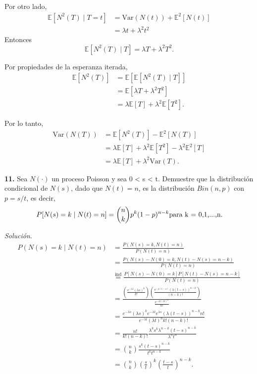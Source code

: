 \documentclass[12pt]{article}
\newcommand{\E}{\mathbb{E}}
\begin{document}
Por otro lado, 
\begin{align*}
\E[N^2(T) \mid T = t] &= \textrm{Var}(N(t)) + \E^2[N(t)] \\    
&= \lambda t + \lambda^2 t^2
\end{align*}
Entonces
\[ \E[N^2(T) \mid T] = \lambda T + \lambda^2 T^2. \]

Por propiedades de la esperanza iterada, 
\begin{align*}
    \E[N^2(T)] &= \E [ \E[N^2(T) \mid T] ] \\
                &= \E [\lambda T + \lambda^2 T^2] \\
                &= \lambda \E[T] + \lambda^2 \E[T^2].
\end{align*}

Por lo tanto,
\begin{align*}
    \textrm{Var}(N(T)) &= \E[N^2(T)] - \E^2[N(T)] \\
    &= \lambda \E[T] + \lambda^2 \E[T^2] -  \lambda^2 \E^2[T] \\
    &= \lambda \E[T] + \lambda^2 \textrm{Var}(T).
\end{align*}

\begin{tcolorbox}[colback=blue!5!white, colframe=blue!5!white, arc=0mm, boxrule=0pt]
    \textbf{11.} Sea $N(\cdot)$ un proceso Poisson y sea 0 < s < t. Demuestre que la distribución condicional de $N(s)$, dado que $N(t) = n$, es la distribución $Bin(n,p)$ con $p = s/t$, es decir,
    \[ P[N(s) = k \mid N(t) = n] = \binom{n}{k}p^{k}(1-p)^{n-k} \textnormal{para k = 0,1,...,n}. \]
\end{tcolorbox} 

\textit{Solución}.
\begin{align*}
P(N(s) = k \mid N(t) = n) &= \frac{P(N(s)=k, N(t) = n)}{P(N(t) = n)}\\
&= \frac{P(N(s)-N(0) = k, N(t)-N(s) = n-k)}{P(N(t) = n)}\\
&\overset{\mathrm{ind}}{=} \frac{P[N(s)-N(0) = k] P[N(t)-N(s) = n-k]}{P(N(t) = n)} \\
&= \frac{\left(\frac{e^{-\lambda s} (\lambda s) ^{k}}{k!}\right) \left(\frac{e^{-\lambda (t-s)} (\lambda (t-s)) ^{n-k}}{(n-k)!}\right)}{\frac{e^{-\lambda t (\lambda t)^{n}}}{n!}} \\
&= \frac{e^{-\lambda s}(\lambda s)^{k} e^{-\lambda t} e^{\lambda s} (\lambda(t-s) )^{n-k} n! }{e^{-\lambda t}(\lambda t )^{n} k! (n-k)! }\\
&= \frac{n!}{k!(n-k)!} \frac{\lambda^{k} s^{k}\lambda^{n-k} (t-s)^{n-k} }{\lambda^{n}t^{n} }\\
&= \binom{n}{k} \frac{s^k(t-s)^{n-k}}{t^k t^{n-k}} \\
&= \binom{n}{k} \left(\frac{s}{t}\right)^{k} \left(\frac{t-s}{t}\right)^{n-k}.
\end{align*}
\end{document}
